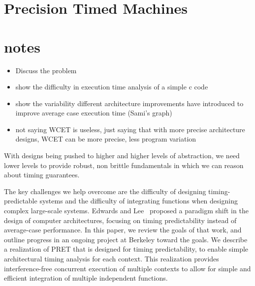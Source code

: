 \section{Precision Timed Machines}


\section{notes}

\begin{itemize}
  \item Discuss the problem
  \item show the difficulty in execution time analysis of a simple c code
  \item show the variability different architecture improvements have introduced to improve average case execution time (Sami's graph)
  \item not saying WCET is useless, just saying that with more precise architecture designs, WCET can be more precise, less program variation
\end{itemize}

With designs being pushed to higher and higher levels of abstraction, we need lower levels to provide robust, non brittle fundamentals in which we can reason about timing guarantees.

The key challenges we help overcome are the difficulty of designing timing-predictable systems and the difficulty of integrating functions when designing complex large-scale systems.
Edwards and Lee~\cite{Edwards2007PRETcase} proposed a paradigm shift in the design of computer architectures, focusing on timing predictability instead of average-case performance. 
In this paper, we review the goals of that work, and outline progress in an ongoing project at Berkeley toward the goals.
We describe a realization of PRET that is designed for timing predictability, to enable simple architectural timing analysis for each context. 
This realization provides interference-free concurrent execution of multiple contexts to allow for simple and efficient integration of multiple independent functions.


